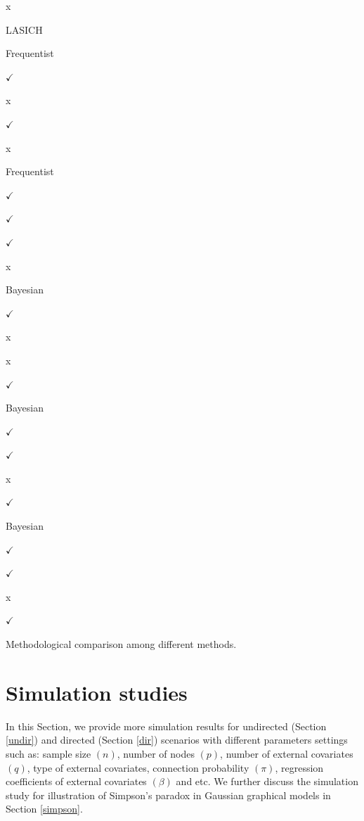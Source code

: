 \documentclass[
]{book}
\begin{document}
x

LASICH \citep{saegusa2016joint}

Frequentist

\(\checkmark\)

x

\(\checkmark\)

x

\citet{zhang2022high}

Frequentist

\(\checkmark\)

\(\checkmark\)

\(\checkmark\)

x

\citet{peterson2015bayesian}

Bayesian

\(\checkmark\)

x

x

\(\checkmark\)

\citet{ni2019bayesian}

Bayesian

\(\checkmark\)

\(\checkmark\)

x

\(\checkmark\)

\citet{wang2021bayesian}

Bayesian

\(\checkmark\)

\(\checkmark\)

x

\(\checkmark\)

\label{tab:differentmodeloverviewqsn4} Methodological comparison among different methods.

\hypertarget{simulation}{%
\chapter{Simulation studies}\label{simulation}}

In this Section, we provide more simulation results for undirected (Section \ref{undir}) and directed (Section \ref{dir}) scenarios with different parameters settings such as: sample size \((n)\), number of nodes \((p)\), number of external covariates \((q)\), type of external covariates, connection probability \((\pi)\), regression coefficients of external covariates \((\beta)\) and etc. We further discuss the simulation study for illustration of Simpson's paradox in Gaussian graphical models in Section \ref{simpson}.
\end{document}
